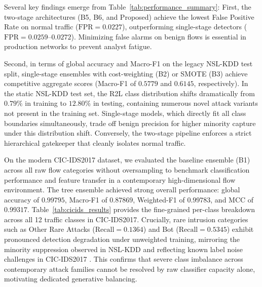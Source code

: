 \documentclass[journal]{IEEEtran}
\begin{document}
Several key findings emerge from Table~\ref{tab:performance_summary}:
First, the two-stage architectures (B5, B6, and Proposed) achieve the lowest False Positive Rate on normal traffic ($\text{FPR} = 0.0227$), outperforming single-stage detectors ($\text{FPR} = 0.0259$--$0.0272$). Minimizing false alarms on benign flows is essential in production networks to prevent analyst fatigue.

Second, in terms of global accuracy and Macro-F1 on the legacy NSL-KDD test split, single-stage ensembles with cost-weighting (B2) or SMOTE (B3) achieve competitive aggregate scores (Macro-F1 of $0.5779$ and $0.6145$, respectively). In the static NSL-KDD test set, the R2L class distribution shifts dramatically from $0.79\%$ in training to $12.80\%$ in testing, containing numerous novel attack variants not present in the training set. Single-stage models, which directly fit all class boundaries simultaneously, trade off benign precision for higher minority capture under this distribution shift. Conversely, the two-stage pipeline enforces a strict hierarchical gatekeeper that cleanly isolates normal traffic.

On the modern CIC-IDS2017 dataset, we evaluated the baseline ensemble (B1) across all raw flow categories without oversampling to benchmark classification performance and feature transfer in a contemporary high-dimensional flow environment. The tree ensemble achieved strong overall performance: global accuracy of $0.99795$, Macro-F1 of $0.87869$, Weighted-F1 of $0.99783$, and MCC of $0.99317$. Table~\ref{tab:cicids_results} provides the fine-grained per-class breakdown across all 12 traffic classes in CIC-IDS2017. Crucially, rare intrusion categories such as Other Rare Attacks ($\text{Recall} = 0.1364$) and Bot ($\text{Recall} = 0.5345$) exhibit pronounced detection degradation under unweighted training, mirroring the minority suppression observed in NSL-KDD and reflecting known label noise challenges in CIC-IDS2017 \cite{engelen2021troubleshooting}. This confirms that severe class imbalance across contemporary attack families cannot be resolved by raw classifier capacity alone, motivating dedicated generative balancing.
\end{document}
